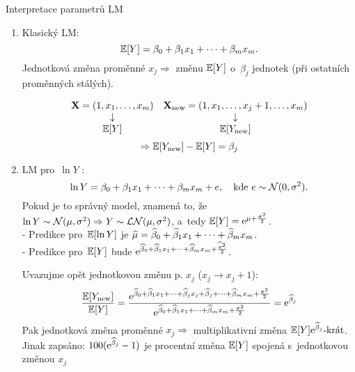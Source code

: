 \begin{remark}
Interpretace parametrů LM

\begin{enumerate}
\item Klasický LM:
 $$
 \mathbb{E} [Y] = \beta_0 + \beta_1 x_1 +\dots + \beta_m x_m.
 $$
Jednotková změna proměnné $x_j \Rightarrow$ změnu $\mathbb{E} [Y]$ o~$\beta_j$ jednotek (při ostatních proměnných stálých).

 $$
\begin{matrix}
\mathbf{X} = (1,x_1,\dots,x_m) & \mathbf{X}_{\text{new}} = (1,x_1,\dots,x_j+1,\dots,x_m) \\
\downarrow &  \downarrow \\
\mathbb{E} [Y] & \mathbb{E} [Y_{\text{new}}] \\
\end{matrix}
 $$
 \vspace{0.3cm}
 $$ \Rightarrow \mathbb{E} [Y_{\text{new}}] - \mathbb{E} [Y] = \beta_j $$
\item LM pro~$\ln Y$ :
 $$
 \ln Y = \beta_0 + \beta_1 x_1 +\dots + \beta_m x_m + e, \quad \text{kde } e \sim \mathcal{N}(0,\sigma^2).
 $$
Pokud je to správný model, znamená to, že $\ln Y \sim \mathcal{N}(\mu,\sigma^2) \Rightarrow Y \sim \mathcal{LN}(\mu,\sigma^2)$, a~tedy $\mathbb{E}[Y] = \mathrm{e}^{\mu + \frac{\sigma^2}{2}}$. \\
- Predikce pro~$\mathbb{E} [\ln Y]$ je $\widehat{\mu} = \widehat{\beta}_0 + \widehat{\beta}_1 x_1 +\dots + \widehat{\beta}_m x_m$. \\
- Predikce pro~$\mathbb{E} [Y]$ bude $\mathrm{e}^{\widehat{\beta}_0 + \widehat{\beta}_1 x_1 +\dots + \widehat{\beta}_m x_m + \frac{\widehat{\sigma}^2}{2}}$.

Uvazujme opět jednotkovou změnu p. $x_j$ ($x_j \rightarrow x_j + 1$):
 $$
\frac{ \mathbb{E} [Y_{\text{new}}]}{\mathbb{E} [Y]} = \frac{\mathrm{e}^{\widehat{\beta}_0 + \widehat{\beta}_1 x_1 +\dots + \widehat{\beta}_j x_j + \widehat{\beta}_j +\dots + \widehat{\beta}_m x_m + \frac{\sigma^2}{2}}}{\mathrm{e}^{\widehat{\beta}_0 + \widehat{\beta}_1 x_1 +\dots + \widehat{\beta}_m x_m + \frac{\sigma^2}{2}}} = \mathrm{e}^{\widehat{\beta}_j}
 $$
Pak jednotková změna proměnné $x_j \Rightarrow$ multiplikativní změna $\mathbb{E} [Y] \mathrm{e}^{\widehat{\beta}_j}\text{-krát}$. Jinak zapsáno: $100(\mathrm{e}^{\widehat{\beta}_j}-1)$ je procentní změna $\mathbb{E} [Y]$ spojená s~jednotkovou změnou $x_j$
\end{enumerate}
\end{remark}

